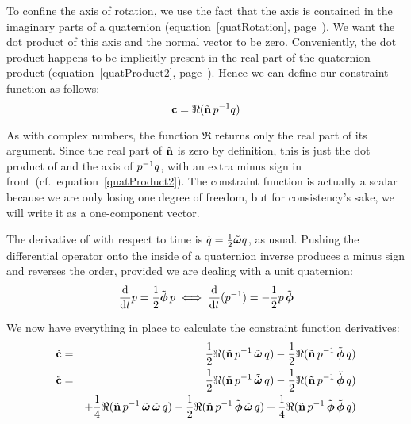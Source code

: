 To confine the axis of rotation, we use the fact that the axis is contained in the imaginary
parts of a quaternion (equation~\ref{quatRotation}, page~\pageref{quatRotation}). We want the dot
product of this axis and the normal vector  to be zero. Conveniently, the dot product
happens to be implicitly present in the real part of the quaternion product
(equation~\ref{quatProduct2}, page~\pageref{quatProduct2}). Hence we can define our constraint
function as follows:
\begin{equation}
\ve{c} = \Re(\tilde{\ve{n}}\, \q{p}^{-1}\q{q})
\end{equation}

As with complex numbers, the function $\Re$ returns only the real part of its argument.
Since the real part of $\tilde{\ve{n}}$ is zero by definition, this is just the dot product of
 and the axis of $\mbox{$p$}^{-1}\mbox{$q$}$, with an extra minus sign in
front~(cf.\ equation~\ref{quatProduct2}). The constraint function is actually a scalar because
we are only losing one degree of freedom, but for consistency's sake, we will write it as a
one-component vector.

The derivative of  with respect to time is
$\dot{\q{q}} = \frac{1}{2}\tilde{\ve{\omega}}\q{q}$, as usual. Pushing the differential operator
onto the inside of a quaternion inverse produces a minus sign and reverses the order, provided
we are dealing with a unit quaternion:
\begin{equation}
\frac{\diff}{\diff t} \q{p} = \frac{1}{2}\tilde{\ve{\phi}}\,\q{p} \iff
    \frac{\diff}{\diff t} (\q{p}^{-1}) = -\frac{1}{2}\q{p}\,\tilde{\ve{\phi}}
\end{equation}

We now have everything in place to calculate the constraint function derivatives:
\begin{eqnarray}
\dot{\ve{c}} & = & \label{constrJoystickC}
    \frac{1}{2} \Re(\tilde{\ve{n}}\, \q{p}^{-1}\, \tilde{\ve{\omega}}\,\q{q}) -
    \frac{1}{2} \Re(\tilde{\ve{n}}\, \q{p}^{-1}\, \tilde{\ve{\phi}}\, \q{q}) \\
\ddot{\ve{c}} & = & \label{constrJoystickCDot}
    \frac{1}{2} \Re(\tilde{\ve{n}}\, \q{p}^{-1}\, \tilde{\dot{\ve{\omega}}}\,\q{q})
  - \frac{1}{2} \Re(\tilde{\ve{n}}\, \q{p}^{-1}\, \tilde{\dot{\ve{\phi}}}\, \q{q}) \\*
&&+ \frac{1}{4} \Re(\tilde{\ve{n}}\, \q{p}^{-1}\, \tilde{\ve{\omega}}\,\tilde{\ve{\omega}}\, \q{q})
  - \frac{1}{2} \Re(\tilde{\ve{n}}\, \q{p}^{-1}\, \tilde{\ve{\phi}}\,\tilde{\ve{\omega}}\, \q{q})
  + \frac{1}{4} \Re(\tilde{\ve{n}}\, \q{p}^{-1}\, \tilde{\ve{\phi}}\,\tilde{\ve{\phi}}\, \q{q})
    \nonumber
\end{eqnarray}

